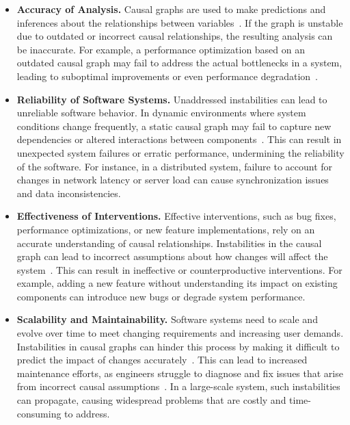 \begin{itemize}
    \item \textbf{Accuracy of Analysis.} Causal graphs are used to make predictions and inferences about the relationships between variables~\cite{liang2021normalized}. If the graph is unstable due to outdated or incorrect causal relationships, the resulting analysis can be inaccurate. For example, a performance optimization based on an outdated causal graph may fail to address the actual bottlenecks in a system, leading to suboptimal improvements or even performance degradation~\cite{10.1007/978-3-030-59152-6_19, 10.1145/3492321.3519575}.

    \item \textbf{Reliability of Software Systems.} Unaddressed instabilities can lead to unreliable software behavior. In dynamic environments where system conditions change frequently, a static causal graph may fail to capture new dependencies or altered interactions between components~\cite{7097740}. This can result in unexpected system failures or erratic performance, undermining the reliability of the software. For instance, in a distributed system, failure to account for changes in network latency or server load can cause synchronization issues and data inconsistencies.

    \item \textbf{Effectiveness of Interventions.} Effective interventions, such as bug fixes, performance optimizations, or new feature implementations, rely on an accurate understanding of causal relationships. Instabilities in the causal graph can lead to incorrect assumptions about how changes will affect the system~\cite{sharma2021dowhy}. This can result in ineffective or counterproductive interventions. For example, adding a new feature without understanding its impact on existing components can introduce new bugs or degrade system performance.

    \item \textbf{Scalability and Maintainability.} Software systems need to scale and evolve over time to meet changing requirements and increasing user demands. Instabilities in causal graphs can hinder this process by making it difficult to predict the impact of changes accurately~\cite{9218193}. This can lead to increased maintenance efforts, as engineers struggle to diagnose and fix issues that arise from incorrect causal assumptions~\cite{7321183}. In a large-scale system, such instabilities can propagate, causing widespread problems that are costly and time-consuming to address.


\end{itemize}
